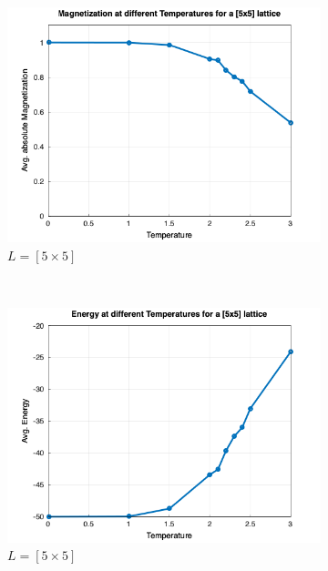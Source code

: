 \begin{figure}[t]
	\centering
	\begin{subfigure}{0.5\textwidth}
		\includegraphics[width=\textwidth]{./img/avg_mag_5.png}
		\caption{$L=[5\times5]$}
		\label{sfig:sublabel1}
	\end{subfigure}%
	~
	\begin{subfigure}{0.5\textwidth}
		\includegraphics[width=\textwidth]{./img/avg_en_5.png}
		\caption{$L=[5\times5]$}
		\label{sfig:sublabel2}
	\end{subfigure}\\
	\begin{subfigure}{0.5\textwidth}

\end{subfigure}
\end{figure}
